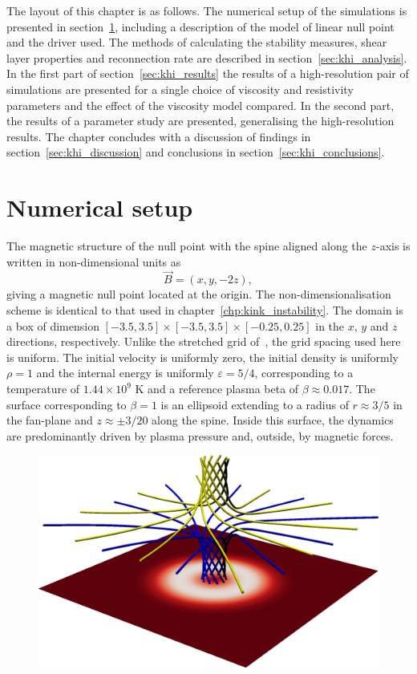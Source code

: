 The layout of this chapter is as follows. The numerical setup of the simulations is presented in section~\ref{sec:khi_numerical_setup}, including a description of the model of linear null point and the driver used. The methods of calculating the stability measures, shear layer properties and reconnection rate are described in section~\ref{sec:khi_analysis}. In the first part of section~\ref{sec:khi_results} the results of a high-resolution pair of simulations are presented for a single choice of viscosity and resistivity parameters and the effect of the viscosity model compared. In the second part, the results of a parameter study are presented, generalising the high-resolution results. The chapter concludes with a discussion of findings in section~\ref{sec:khi_discussion} and conclusions in section~\ref{sec:khi_conclusions}.

\section{Numerical setup}

\label{sec:khi_numerical_setup}

The magnetic structure of the null point with the spine aligned along the $z$-axis is written in non-dimensional units as
\begin{equation}
  \label{eq:null_point_field}
  \vec{B} = (x, y, -2z),
\end{equation}
giving a magnetic null point located at the origin. The non-dimensionalisation scheme is identical to that used in chapter~\ref{chp:kink_instability}. The domain is a box of dimension $[-3.5, 3.5]\times[-3.5, 3.5]\times [-0.25, 0.25] $ in the $x$, $y$ and $z$ directions, respectively. Unlike the stretched grid of~\cite{wyperKelvinHelmholtzInstabilityCurrentvortex2013}, the grid spacing used here is uniform. The initial velocity is uniformly zero, the initial density is uniformly $\rho = 1$ and the internal energy is uniformly $\varepsilon = 5/4$, corresponding to a temperature of $1.44 \times 10^9$ K and a reference plasma beta of $\beta \approx 0.017$. The surface corresponding to $\beta = 1$ is an ellipsoid extending to a radius of $r \approx 3/5$ in the fan-plane and $z \approx \pm 3/20$ along the spine. Inside this surface, the dynamics are predominantly driven by plasma pressure and, outside, by magnetic forces.

\begin{figure}[t]
  \centering
      \includegraphics[width=0.5\linewidth]{field_line_plots/cropped/v-4r-4-isotropic_0008_cropped.png}
  \label{fig:field_line_plots/v-4r-4-iso-field-8}
\end{figure}

